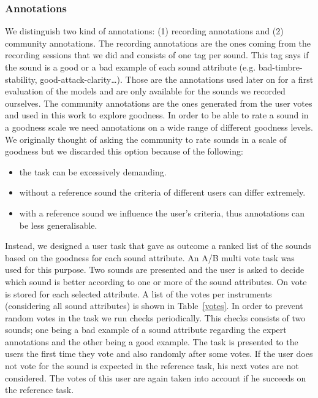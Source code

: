 \documentclass{article}
\begin{document}
\subsubsection{Annotations}
We distinguish two kind of annotations: (1) recording annotations and (2) community annotations. The recording annotations are the ones coming from the recording sessions that we did and consists of one tag per sound. This tag says if the sound is a good or a bad example of each sound attribute (e.g. bad-timbre-stability, good-attack-clarity…). Those are the annotations used later on for a first evaluation of the models and are only available for the sounds we recorded ourselves.
The community annotations are the ones generated from the user votes and used in this work to explore goodness. In order to be able to rate a sound in a goodness scale we need annotations on a wide range of different goodness levels. We originally thought of asking the community to rate sounds in a scale of goodness but we discarded this option because of the following:

\begin{itemize}
	\item{the task can be excessively demanding.}
	\item{without a reference sound the criteria of different users can differ extremely.}
	\item{with a reference sound we influence the user’s criteria, thus annotations can be less 	generalisable.}
\end{itemize}

Instead, we designed a user task that gave as outcome a ranked list of the sounds based on the goodness for each sound attribute. An A/B multi vote task was used for this purpose. Two sounds are presented and the user is asked to decide which sound is better according to one or more of the sound attributes. On vote is stored for each selected attribute. A list of the votes per instruments (considering all sound attributes) is shown in Table~\ref{votes}.
In order to prevent random votes in the task we run checks periodically. This checks consists of two sounds; one being a bad example of a sound attribute regarding the expert annotations and the other being a good example. The task is presented to the users the first time they vote and also randomly after some votes. If the user does not vote for the sound is expected in the reference task, his next votes are not considered. The votes of this user are again taken into account if he succeeds on the reference task. 
\end{document}
